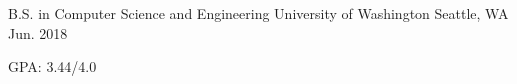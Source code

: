 

\begin{cventries}

  \cventry
    {B.S. in Computer Science and Engineering} %
    {University of Washington} %
    {Seattle, WA} %
    {Jun. 2018} %
    {
      \begin{cvitems} %
        \item {GPA: 3.44/4.0}
      \end{cvitems}
    }

\end{cventries}
